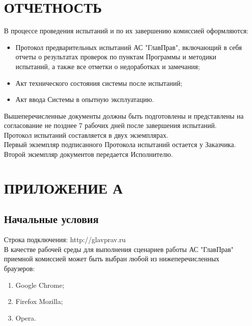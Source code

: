 \documentclass[russian, utf8, 12pt,pointsubsection,floatsubsection]{eskdtext}
\begin{document}
\section{ОТЧЕТНОСТЬ}
В процессе проведения испытаний и по их завершению комиссией оформляются:

\begin{itemize}
    \item Протокол предварительных испытаний АС "ГлавПрав", включающий в себя отчеты о результатах проверок по пунктам Программы и методики испытаний, а также все отметки о недоработках и замечания;
    \item Акт технического состояния системы после испытаний;
    \item Акт ввода Системы в опытную эксплуатацию.
\end{itemize}
Вышеперечисленные документы должны быть подготовлены и представлены на согласование не позднее 7 рабочих дней после завершения испытаний.\\
Протокол испытаний составляется в двух экземплярах.\\
Первый экземпляр подписанного Протокола испытаний остается у Заказчика. Второй экземпляр документов передается Исполнителю.\\

\section{ПРИЛОЖЕНИЕ А}
\subsection{Начальные условия}
Строка подключения: http://glavprav.ru \\
В качестве рабочей среды для выполнения сценариев работы АС "ГлавПрав" приемной комиссией может быть выбран любой из нижеперечисленных браузеров: 
\begin{enumerate}
    \item Google Chrome;
    \item Firefox Mozilla;
    \item Opera.
\end{enumerate}
\end{document}

